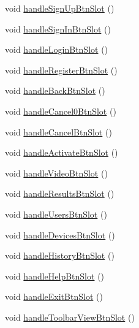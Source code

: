 \begin{DoxyCompactItemize}
void \hyperlink{class_master_gui_a551dd5376b4fe1b8481cf5389611b780}{handle\-Sign\-Up\-Btn\-Slot} ()
\item 
void \hyperlink{class_master_gui_afa3826a40415ae50f61a08f48232035b}{handle\-Sign\-In\-Btn\-Slot} ()
\item 
void \hyperlink{class_master_gui_a4d9ea1e7af66093ff307b8a832350a4f}{handle\-Login\-Btn\-Slot} ()
\item 
void \hyperlink{class_master_gui_ad42fc0777b331eb61eda315cf9ded6f6}{handle\-Register\-Btn\-Slot} ()
\item 
void \hyperlink{class_master_gui_a2e9b9de115d44f04ba3da2c965f60816}{handle\-Back\-Btn\-Slot} ()
\item 
void \hyperlink{class_master_gui_a42e6c23c4d7ef18e245dbabcca7fa67a}{handle\-Cancel0\-Btn\-Slot} ()
\item 
void \hyperlink{class_master_gui_acde9d054d30c33783e809f5ca7591055}{handle\-Cancel\-Btn\-Slot} ()
\item 
void \hyperlink{class_master_gui_a366198accc8c0f5baf7abd9ec291c6cd}{handle\-Activate\-Btn\-Slot} ()
\item 
void \hyperlink{class_master_gui_a49907066b49f8b844892c0a30ea4576b}{handle\-Video\-Btn\-Slot} ()
\item 
void \hyperlink{class_master_gui_a8abb5791d6d76377da005631250ca3e8}{handle\-Results\-Btn\-Slot} ()
\item 
void \hyperlink{class_master_gui_a45376186409ece6660475a724b75330d}{handle\-Users\-Btn\-Slot} ()
\item 
void \hyperlink{class_master_gui_a64741e8bdb9f3d179eb6a01f58e5a56e}{handle\-Devices\-Btn\-Slot} ()
\item 
void \hyperlink{class_master_gui_ad36d566140ec3ab0f2393bddf88639cc}{handle\-History\-Btn\-Slot} ()
\item 
void \hyperlink{class_master_gui_a58ecf3c83023706cf9bc3b53aa255e25}{handle\-Help\-Btn\-Slot} ()
\item 
void \hyperlink{class_master_gui_a64e1a89f50535a3cb03066b7a8cc69d8}{handle\-Exit\-Btn\-Slot} ()
\item 
void \hyperlink{class_master_gui_afa9fabec09189c4b3f593ced2d79a542}{handle\-Toolbar\-View\-Btn\-Slot} ()
\end{DoxyCompactItemize}
